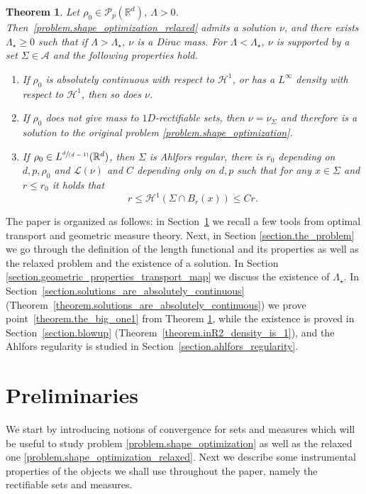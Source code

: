 \documentclass[10pt]{amsart}
\newcommand{\spfrac}[2]{\sfrac{#1}{(#2)}}
\newtheorem{theorem}{Theorem}[section]
\theoremstyle{definition}
\newcommand\cH{\mathcal{H}}
\newcommand{\RR}{\mathbb{R}}
\begin{document}
\begin{theorem}\label{theorem.the_big_one}
Let $\rho_0 \in \mathcal{P}_p(\RR^d)$, $\Lambda>0$. Then~\eqref{problem.shape_optimization_relaxed} admits a solution $\nu$, and there exists $\Lambda_\star \ge 0$ such that if $\Lambda>\Lambda_\star$, $\nu$ is a Dirac mass. For $\Lambda<\Lambda_\star$, $\nu$ is supported by a set $\Sigma \in \mathcal{A}$ and the following properties hold.
\begin{enumerate}
\item\label{theorem.the_big_one1}
If $\rho_0$ is absolutely continuous with respect to $\cH^1$, or has a $L^\infty$ density with respect to $\cH^1$, then so does $\nu$.
\item\label{theorem.the_big_one2}
If $\rho_0$ does not give mass to $1D$-rectifiable sets, then $\nu=\nu_\Sigma$ and therefore is a solution to the original problem \eqref{problem.shape_optimization}.
\item\label{theorem.the_big_one3}
If $\rho_0 \in L^{\spfrac{d}{d-1}}(\RR^d)$, then $\Sigma$ is Ahlfors regular, \ie there is $r_0$ depending on $d,p,\rho_0$ and $\mathcal{L}(\nu)$ and $C$ depending only on $d,p$ such that for any $x \in \Sigma$ and $r \le r_0$ it holds that
\[
r \le \cH^1(\Sigma \cap B_r(x))\le Cr.
\]
\end{enumerate}
\end{theorem}


The paper is organized as follows: in Section~\ref{section.preliminary_properties} we recall a few tools from optimal transport and geometric measure theory. Next, in Section \ref{section.the_problem} we go through the definition of the length functional and its properties as well as the relaxed problem and the existence of a solution. In Section \ref{section.geometric_properties_transport_map} we discuss
the existence of $\Lambda_\star$.
In Section~\ref{section.solutions_are_absolutely_continuous}
(Theorem~\ref{theorem.solutions_are_absolutely_continuous}) we prove point~\eqref{theorem.the_big_one1} from Theorem \ref{theorem.the_big_one}, while the existence is proved in Section~\ref{section.blowup} (Theorem~\ref{theorem.inR2_density_is_1}),
and the Ahlfors regularity is studied in Section~\ref{section.ahlfors_regularity}.

\section{Preliminaries}\label{section.preliminary_properties}
We start by introducing notions of convergence for sets and measures which will be useful to study problem \eqref{problem.shape_optimization} as well as the relaxed one \eqref{problem.shape_optimization_relaxed}. Next we describe some instrumental properties of the objects we shall use throughout the paper, namely the rectifiable sets and measures.
\end{document}
